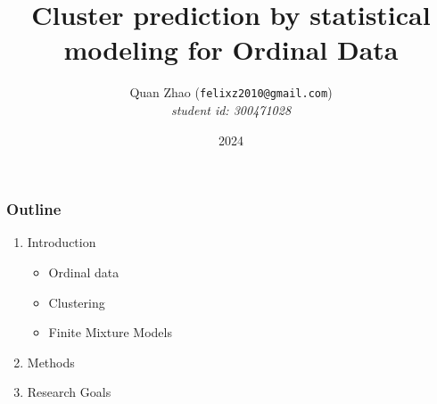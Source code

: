 \documentclass[xcolor=svgnames]{beamer}
\begin{document}
\title{Cluster prediction by statistical modeling for Ordinal Data}
\author{Quan Zhao ({\tt felixz2010@gmail.com})\\[1em]
{\em student id: 300471028}\\[1em]
}

\date{2024}


\begin{frame}\frametitle{
}
\titlepage
\end{frame}


\begin{frame}\frametitle{Outline}

\begin{enumerate}
\item Introduction
\begin{itemize}
\item Ordinal data
\item Clustering
\item Finite Mixture Models
\end{itemize}
\item Methods
\item Research Goals
\end{enumerate}

\end{frame}
\end{document}
